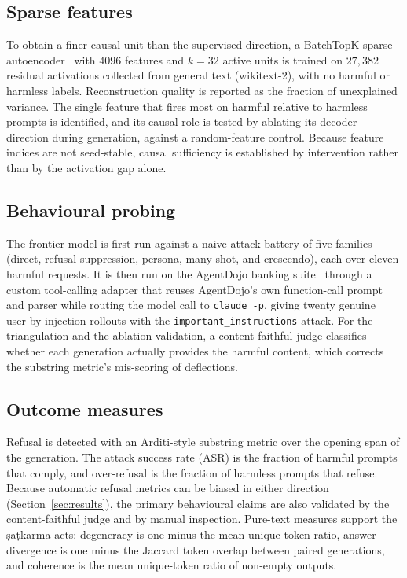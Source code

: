 \subsection{Sparse features}
To obtain a finer causal unit than the supervised direction, a BatchTopK sparse
autoencoder~\cite{bussmann2024batchtopk} with $4096$ features and $k=32$ active units
is trained on $27{,}382$ residual activations collected from general text
(wikitext-2), with no harmful or harmless labels. Reconstruction quality is reported
as the fraction of unexplained variance. The single feature that fires most on
harmful relative to harmless prompts is identified, and its causal role is tested by
ablating its decoder direction during generation, against a random-feature control.
Because feature indices are not seed-stable, causal sufficiency is established by
intervention rather than by the activation gap alone.

\subsection{Behavioural probing}
The frontier model is first run against a naive attack battery of five families
(direct, refusal-suppression, persona, many-shot, and crescendo), each over eleven
harmful requests. It is then run on the AgentDojo banking suite~\cite{debenedetti2024agentdojo}
through a custom tool-calling adapter that reuses AgentDojo's own function-call prompt
and parser while routing the model call to \texttt{claude -p}, giving twenty genuine
user-by-injection rollouts with the \texttt{important\_instructions} attack. For the
triangulation and the ablation validation, a content-faithful judge classifies whether
each generation actually provides the harmful content, which corrects the substring
metric's mis-scoring of deflections.

\subsection{Outcome measures}
Refusal is detected with an Arditi-style substring metric over the opening span of the
generation. The attack success rate (ASR) is the fraction of harmful prompts that
comply, and over-refusal is the fraction of harmless prompts that refuse. Because
automatic refusal metrics can be biased in either direction (Section~\ref{sec:results}),
the primary behavioural claims are also validated by the content-faithful judge and by
manual inspection. Pure-text measures support the \d{s}a\d{t}karma acts: degeneracy is
one minus the mean unique-token ratio, answer divergence is one minus the Jaccard token
overlap between paired generations, and coherence is the mean unique-token ratio of
non-empty outputs.

